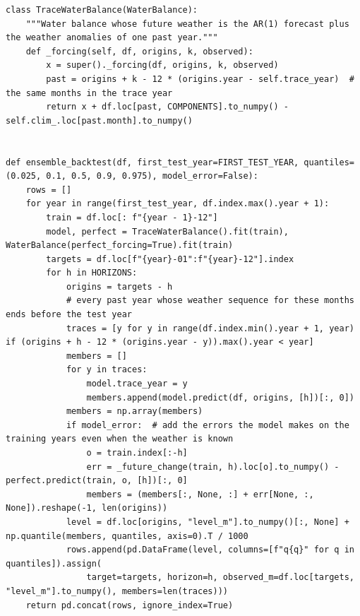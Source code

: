 \documentclass{article}
\begin{document}
\begin{lstlisting}[caption={Forecast ranges}]
class TraceWaterBalance(WaterBalance):
    """Water balance whose future weather is the AR(1) forecast plus the weather anomalies of one past year."""
    def _forcing(self, df, origins, k, observed):
        x = super()._forcing(df, origins, k, observed)
        past = origins + k - 12 * (origins.year - self.trace_year)  # the same months in the trace year
        return x + df.loc[past, COMPONENTS].to_numpy() - self.clim_.loc[past.month].to_numpy()


def ensemble_backtest(df, first_test_year=FIRST_TEST_YEAR, quantiles=(0.025, 0.1, 0.5, 0.9, 0.975), model_error=False):
    rows = []
    for year in range(first_test_year, df.index.max().year + 1):
        train = df.loc[: f"{year - 1}-12"]
        model, perfect = TraceWaterBalance().fit(train), WaterBalance(perfect_forcing=True).fit(train)
        targets = df.loc[f"{year}-01":f"{year}-12"].index
        for h in HORIZONS:
            origins = targets - h
            # every past year whose weather sequence for these months ends before the test year
            traces = [y for y in range(df.index.min().year + 1, year) if (origins + h - 12 * (origins.year - y)).max().year < year]
            members = []
            for y in traces:
                model.trace_year = y
                members.append(model.predict(df, origins, [h])[:, 0])
            members = np.array(members)
            if model_error:  # add the errors the model makes on the training years even when the weather is known
                o = train.index[:-h]
                err = _future_change(train, h).loc[o].to_numpy() - perfect.predict(train, o, [h])[:, 0]
                members = (members[:, None, :] + err[None, :, None]).reshape(-1, len(origins))
            level = df.loc[origins, "level_m"].to_numpy()[:, None] + np.quantile(members, quantiles, axis=0).T / 1000
            rows.append(pd.DataFrame(level, columns=[f"q{q}" for q in quantiles]).assign(
                target=targets, horizon=h, observed_m=df.loc[targets, "level_m"].to_numpy(), members=len(traces)))
    return pd.concat(rows, ignore_index=True)
\end{lstlisting}
\end{document}
